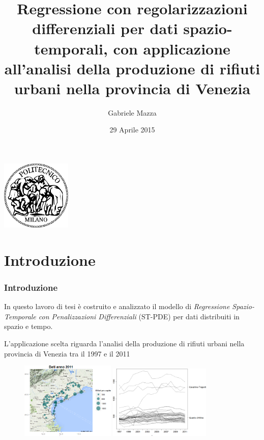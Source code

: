 \documentclass[landscape,9pt]{beamer}                           %
\date{29 Aprile 2015}
\author{Gabriele Mazza}
\title{Regressione con regolarizzazioni differenziali per dati spazio-temporali, con applicazione all'analisi della produzione di rifiuti urbani nella provincia di Venezia}
\begin{document}
\begin{frame}
\maketitle
\begin{center}
\includegraphics[width=0.25\textwidth,
	height=0.28\textheight]
	{Immagini/Logo.png}
\end{center}
\end{frame}

\section{Introduzione}
\begin{frame}
\frametitle{Introduzione}
In questo lavoro di tesi è costruito e analizzato il modello di \textit{Regressione Spazio-Temporale con Penalizzazioni Differenziali} (ST-PDE) per dati distribuiti in spazio e tempo.
\par\bigskip
L'applicazione scelta riguarda l'analisi della produzione di rifiuti urbani nella provincia di Venezia tra il 1997 e il 2011
\begin{figure}[h]
	\centering
	{
		\subfigure
   		{
		\includegraphics[width=0.40\textwidth]{Immagini/CTQDA.png}   
   		}
   	}
	\uncover<2->
	{
	\subfigure
   		{
		\includegraphics[width=0.43\textwidth]{Immagini/andamenti_temporali.png}
   		}
   	}
\end{figure}
\end{frame}
\end{document}
